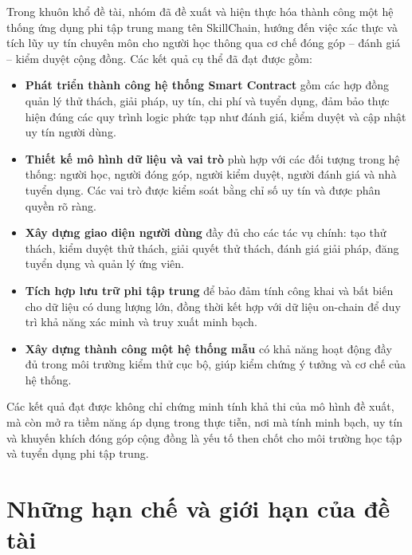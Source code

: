 Trong khuôn khổ đề tài, nhóm đã đề xuất và hiện thực hóa thành công một hệ thống ứng dụng phi tập trung mang tên SkillChain, hướng đến việc xác thực và tích lũy uy tín chuyên môn cho người học thông qua cơ chế đóng góp -- đánh giá -- kiểm duyệt cộng đồng.
Các kết quả cụ thể đã đạt được gồm:
\begin{itemize}
  \item \textbf{Phát triển thành công hệ thống Smart Contract} gồm các hợp đồng quản lý thử thách, giải pháp, uy tín, chi phí và tuyển dụng, đảm bảo thực hiện đúng các quy trình logic phức tạp như đánh giá, kiểm duyệt và cập nhật uy tín người dùng.
  \item \textbf{Thiết kế mô hình dữ liệu và vai trò} phù hợp với các đối tượng trong hệ thống: người học, người đóng góp, người kiểm duyệt, người đánh giá và nhà tuyển dụng. Các vai trò được kiểm soát bằng chỉ số uy tín và được phân quyền rõ ràng.
  \item \textbf{Xây dựng giao diện người dùng} đầy đủ cho các tác vụ chính: tạo thử thách, kiểm duyệt thử thách, giải quyết thử thách, đánh giá giải pháp, đăng tuyển dụng và quản lý ứng viên.
  \item \textbf{Tích hợp lưu trữ phi tập trung} để bảo đảm tính công khai và bất biến cho dữ liệu có dung lượng lớn, đồng thời kết hợp với dữ liệu on-chain để duy trì khả năng xác minh và truy xuất minh bạch.
  \item \textbf{Xây dựng thành công một hệ thống mẫu} có khả năng hoạt động đầy đủ trong môi trường kiểm thử cục bộ, giúp kiểm chứng ý tưởng và cơ chế của hệ thống.
\end{itemize}
Các kết quả đạt được không chỉ chứng minh tính khả thi của mô hình đề xuất, mà còn mở ra tiềm năng áp dụng trong thực tiễn, nơi mà tính minh bạch, uy tín và khuyến khích đóng góp cộng đồng là yếu tố then chốt cho môi trường học tập và tuyển dụng phi tập trung.

\section{Những hạn chế và giới hạn của đề tài}

